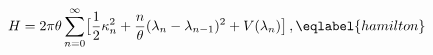 \begin{equation}
H = 2\pi\theta\sum_{n=0}^{\infty} \bigl[ {\frac12} \kappa_n^2
+ \frac n\theta (\lambda_n-\lambda_{n-1})^2 + V(\lambda_n)
\bigr] \,,
\eqlabel{hamilton}
\end{equation}

